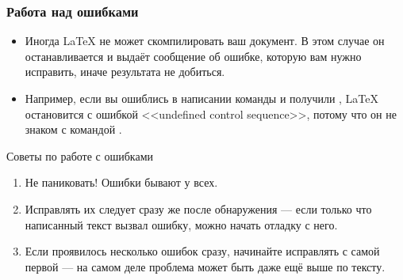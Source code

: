 \documentclass{beamer}
\begin{document}
\begin{frame}[fragile]
\frametitle{Работа над ошибками}
\vspace{-3ex}
\small
\begin{itemize}
\item Иногда \LaTeX{} не может скомпилировать ваш документ. В этом случае он
останавливается и выдаёт сообщение об ошибке, которую вам нужно исправить,
иначе результата не добиться.
\item Например, если вы ошиблись в написании команды  и получили
, \LaTeX{} остановится с ошибкой <<undefined control sequence>>,
потому что он не знаком с командой .
\end{itemize}
\vspace{-1ex}
\begin{tblock}{Советы по работе с ошибками}
\begin{enumerate}
\item Не паниковать! Ошибки бывают у всех.
\item Исправлять их следует сразу же после обнаружения --- если только что написанный
текст вызвал ошибку, можно начать отладку с него.
\item Если проявилось несколько ошибок сразу, начинайте исправлять с самой первой ---
на самом деле проблема может быть даже ещё выше по тексту.
\end{enumerate}
\end{tblock}
\end{frame}
\end{document}
